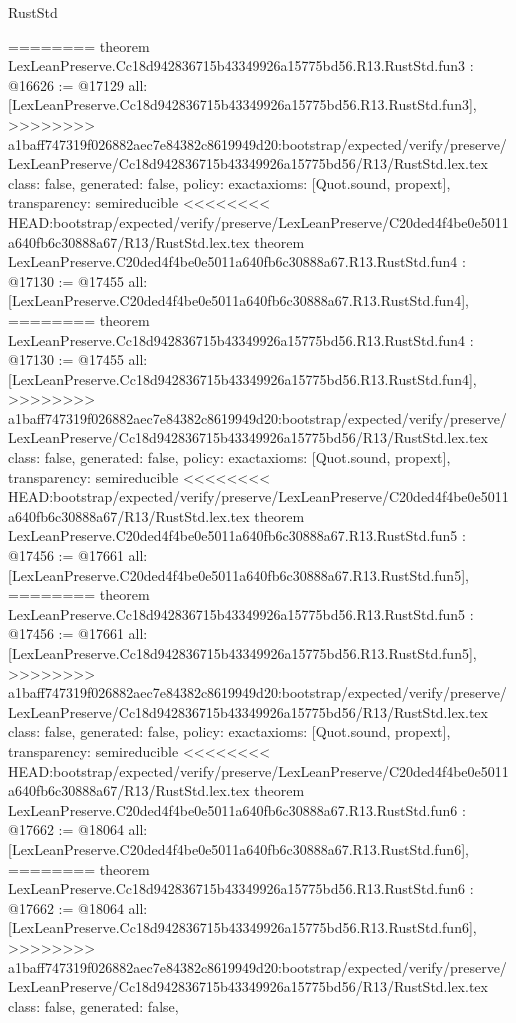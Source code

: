 \begin{lexlean}{RustStd}
\begin{coremodule}
{\begin{coremodule}
{{{{{{========
theorem LexLeanPreserve.Cc18d942836715b43349926a15775bd56.R13.RustStd.fun3 : @16626 := @17129 {
  all: [LexLeanPreserve.Cc18d942836715b43349926a15775bd56.R13.RustStd.fun3],
>>>>>>>> a1baff747319f026882aec7e84382c8619949d20:bootstrap/expected/verify/preserve/LexLeanPreserve/Cc18d942836715b43349926a15775bd56/R13/RustStd.lex.tex
  class: false,
  generated: false,
  policy: exact{axioms: [Quot.sound, propext]},
  transparency: semireducible
}
<<<<<<<< HEAD:bootstrap/expected/verify/preserve/LexLeanPreserve/C20ded4f4be0e5011a640fb6c30888a67/R13/RustStd.lex.tex
theorem LexLeanPreserve.C20ded4f4be0e5011a640fb6c30888a67.R13.RustStd.fun4 : @17130 := @17455 {
  all: [LexLeanPreserve.C20ded4f4be0e5011a640fb6c30888a67.R13.RustStd.fun4],
========
theorem LexLeanPreserve.Cc18d942836715b43349926a15775bd56.R13.RustStd.fun4 : @17130 := @17455 {
  all: [LexLeanPreserve.Cc18d942836715b43349926a15775bd56.R13.RustStd.fun4],
>>>>>>>> a1baff747319f026882aec7e84382c8619949d20:bootstrap/expected/verify/preserve/LexLeanPreserve/Cc18d942836715b43349926a15775bd56/R13/RustStd.lex.tex
  class: false,
  generated: false,
  policy: exact{axioms: [Quot.sound, propext]},
  transparency: semireducible
}
<<<<<<<< HEAD:bootstrap/expected/verify/preserve/LexLeanPreserve/C20ded4f4be0e5011a640fb6c30888a67/R13/RustStd.lex.tex
theorem LexLeanPreserve.C20ded4f4be0e5011a640fb6c30888a67.R13.RustStd.fun5 : @17456 := @17661 {
  all: [LexLeanPreserve.C20ded4f4be0e5011a640fb6c30888a67.R13.RustStd.fun5],
========
theorem LexLeanPreserve.Cc18d942836715b43349926a15775bd56.R13.RustStd.fun5 : @17456 := @17661 {
  all: [LexLeanPreserve.Cc18d942836715b43349926a15775bd56.R13.RustStd.fun5],
>>>>>>>> a1baff747319f026882aec7e84382c8619949d20:bootstrap/expected/verify/preserve/LexLeanPreserve/Cc18d942836715b43349926a15775bd56/R13/RustStd.lex.tex
  class: false,
  generated: false,
  policy: exact{axioms: [Quot.sound, propext]},
  transparency: semireducible
}
<<<<<<<< HEAD:bootstrap/expected/verify/preserve/LexLeanPreserve/C20ded4f4be0e5011a640fb6c30888a67/R13/RustStd.lex.tex
theorem LexLeanPreserve.C20ded4f4be0e5011a640fb6c30888a67.R13.RustStd.fun6 : @17662 := @18064 {
  all: [LexLeanPreserve.C20ded4f4be0e5011a640fb6c30888a67.R13.RustStd.fun6],
========
theorem LexLeanPreserve.Cc18d942836715b43349926a15775bd56.R13.RustStd.fun6 : @17662 := @18064 {
  all: [LexLeanPreserve.Cc18d942836715b43349926a15775bd56.R13.RustStd.fun6],
>>>>>>>> a1baff747319f026882aec7e84382c8619949d20:bootstrap/expected/verify/preserve/LexLeanPreserve/Cc18d942836715b43349926a15775bd56/R13/RustStd.lex.tex
  class: false,
  generated: false,
}}}}}}}}}}
\end{coremodule}}
\end{coremodule}
\end{lexlean}
